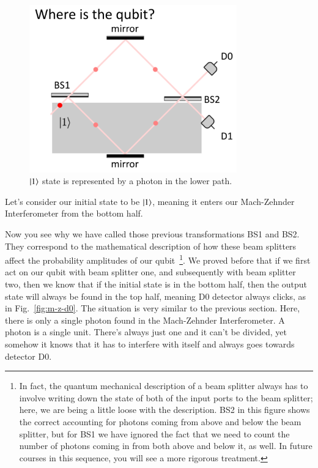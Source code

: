 \begin{figure}[H]
   \centering
    \includegraphics[width=0.8\textwidth]{lesson6/1_ket_bottom.pdf}
    
        \caption{$\left| 1 \right\rangle$ state is represented by a photon in the lower path.}
    \label{fig:m-z-lower}
    
\end{figure}

Let's consider our initial state to be $\left| 1 \right\rangle$, meaning it enters our Mach-Zehnder Interferometer from the bottom half.

Now you see why we have called those previous transformations BS1 and BS2. They correspond to the mathematical description of how these beam splitters affect the probability amplitudes of our qubit~\footnote{In fact, the quantum mechanical description of a beam splitter always has to involve writing down the state of both of the input ports to the beam splitter; here, we are being a little loose with the description. BS2 in this figure shows the correct accounting for photons coming from above and below the beam splitter, but for BS1 we have ignored the fact that we need to count the number of photons coming in from both above and below it, as well.  In future courses in this sequence, you will see a more rigorous treatment.}. We proved before that if we first act on our qubit with beam splitter one, and subsequently with beam splitter two, then we know that if the initial state is in the bottom half, then the output state will always be found in the top half, meaning D0 detector always clicks, as in Fig.~\ref{fig:m-z-d0}. The situation is very similar to the previous section. Here, there is only a single photon found in the Mach-Zehnder Interferometer. A photon is a single unit. There's always just one and it can't be divided, yet somehow it knows that it has to interfere with itself and always goes towards detector D0.

